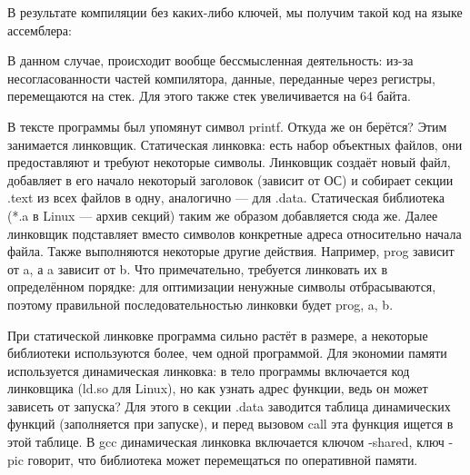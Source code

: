 \documentclass[main]{subfiles}
\begin{document}
В результате компиляции без каких-либо ключей, мы получим такой код на
языке ассемблера:


В данном случае, происходит вообще бессмысленная деятельность: из-за несогласованности
частей компилятора, данные, переданные через регистры, перемещаются на стек.
Для этого также стек увеличивается на 64 байта.

В тексте программы был упомянут символ printf. Откуда же он берётся?
Этим занимается линковщик.
Статическая линковка: есть набор объектных файлов, они предоставляют и требуют
некоторые символы. Линковщик создаёт новый файл, добавляет в его начало
некоторый заголовок (зависит от ОС) и собирает секции .text из всех
файлов в одну, аналогично --- для .data. Статическая библиотека (*.a в Linux ---
архив секций) таким же образом добавляется сюда же.
Далее линковщик подставляет вместо символов конкретные адреса относительно
начала файла. Также выполняются некоторые другие действия.
Например, prog зависит от a, а a зависит от b. Что примечательно,
требуется линковать их в определённом порядке: для оптимизации ненужные
символы отбрасываются, поэтому правильной последовательностью линковки
будет prog, a, b.

При статической линковке программа сильно растёт в размере, а некоторые
библиотеки используются более, чем одной программой. Для экономии памяти
используется динамическая линковка: в тело программы включается код
линковщика (ld.so для Linux), но как узнать адрес функции, ведь он может
зависеть от запуска? Для этого в секции .data заводится таблица динамических
функций (заполняется при запуске), и перед вызовом call эта функция ищется
в этой таблице. В gcc динамическая линковка включается ключом -shared,
ключ -pic говорит, что библиотека может перемещаться по оперативной
памяти.
\end{document}
